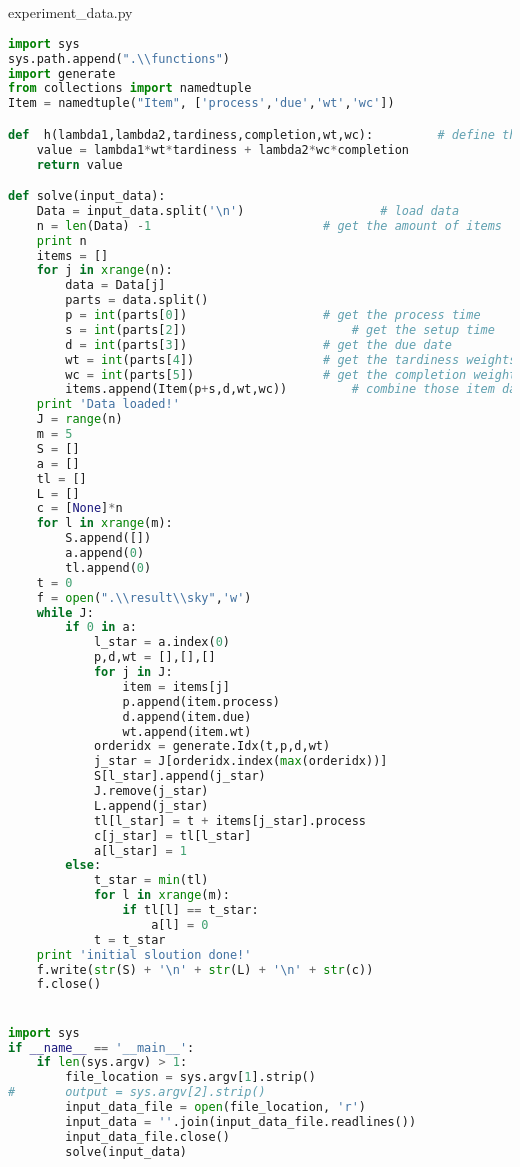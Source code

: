 \chapter{\appendixtitle}
\begin{asparaenum}
\item experiment\_data.py
\end{asparaenum}
\begin{lstlisting}[language = Python]
import sys
sys.path.append(".\\functions")
import generate
from collections import namedtuple
Item = namedtuple("Item", ['process','due','wt','wc'])

def  h(lambda1,lambda2,tardiness,completion,wt,wc):			# define the contribution of one item for the obj function
	value = lambda1*wt*tardiness + lambda2*wc*completion
	return value

def solve(input_data):
	Data = input_data.split('\n')					# load data
	n = len(Data) -1						# get the amount of items
	print n
	items = []
	for j in xrange(n):
		data = Data[j]
		parts = data.split()
		p = int(parts[0])					# get the process time
		s = int(parts[2])						# get the setup time
		d = int(parts[3])					# get the due date
		wt = int(parts[4])					# get the tardiness weights
		wc = int(parts[5])					# get the completion weights
		items.append(Item(p+s,d,wt,wc))			# combine those item data
	print 'Data loaded!'
	J = range(n)
	m = 5
	S = []
	a = []
	tl = []
	L = []
	c = [None]*n
	for l in xrange(m):
		S.append([])
		a.append(0)
		tl.append(0)
	t = 0
	f = open(".\\result\\sky",'w')
	while J:
		if 0 in a:
			l_star = a.index(0)
			p,d,wt = [],[],[]
			for j in J:				
				item = items[j]
				p.append(item.process)
				d.append(item.due)
				wt.append(item.wt)
			orderidx = generate.Idx(t,p,d,wt)
			j_star = J[orderidx.index(max(orderidx))]
			S[l_star].append(j_star)
			J.remove(j_star)
			L.append(j_star)
			tl[l_star] = t + items[j_star].process
			c[j_star] = tl[l_star]
			a[l_star] = 1
		else:
			t_star = min(tl)
			for l in xrange(m):
				if tl[l] == t_star:
					a[l] = 0
			t = t_star
	print 'initial sloution done!'
	f.write(str(S) + '\n' + str(L) + '\n' + str(c))
	f.close()


import sys
if __name__ == '__main__':
	if len(sys.argv) > 1:
		file_location = sys.argv[1].strip()
#		output = sys.argv[2].strip()
		input_data_file = open(file_location, 'r')
		input_data = ''.join(input_data_file.readlines())
		input_data_file.close()
		solve(input_data)
\end{lstlisting}
